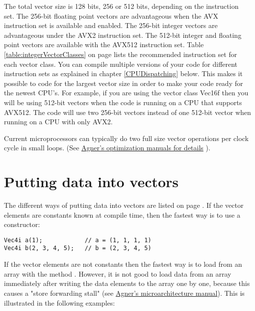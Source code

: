\documentclass[vcl_manual.tex]{subfiles}
\begin{document}
The total vector size is 128 bits, 256 or 512 bits, depending on the instruction set. 
The 256-bit floating point vectors are advantageous when the AVX instruction set is available and enabled. The 256-bit integer vectors are advantageous under the AVX2 instruction set. 
The 512-bit integer and floating point vectors are available with the AVX512 instruction set.
Table \ref{table:integerVectorClasses} on page \pageref{table:integerVectorClasses} lists the recommended instruction set for each vector class. 
You can compile multiple versions of your code for different instruction sets as explained in chapter \ref{CPUDispatching} below. This makes it possible to code for the largest vector size in order to make your code ready for the newest CPU's. 
For example, if you are using the vector class Vec16f then you will be using 512-bit vectors when the code is running on a CPU that supports AVX512. The code will use two 256-bit vectors instead of one 512-bit vector when running on a CPU with only AVX2.

Current microprocessors can typically do two full size vector operations per clock cycle in small loops. (See \href{https://www.agner.org/optimize/#manuals}{Agner's optimization manuals for details} ).


\section{Putting data into vectors}\label{PuttingDataIntoVectors}

The different ways of putting data into vectors are listed on page \pageref{ConstructingVectors}. If the vector elements are constants known at compile time, then the fastest way is to use a constructor:
\begin{example}
\label{exampleVectConstructor}
\end{example}
\begin{lstlisting}[frame=single]
Vec4i a(1);            // a = (1, 1, 1, 1)
Vec4i b(2, 3, 4, 5);   // b = (2, 3, 4, 5)
\end{lstlisting}

If the vector elements are not constants then the fastest way is to load from an array with the method . However, it is not good to load data from an array immediately after writing the data elements to the array one by one, because this causes a "store forwarding stall" (see \href{https://www.agner.org/optimize/#manual_cpp}{Agner's microarchitecture manual}). This is illustrated in the following examples:
\end{document}
